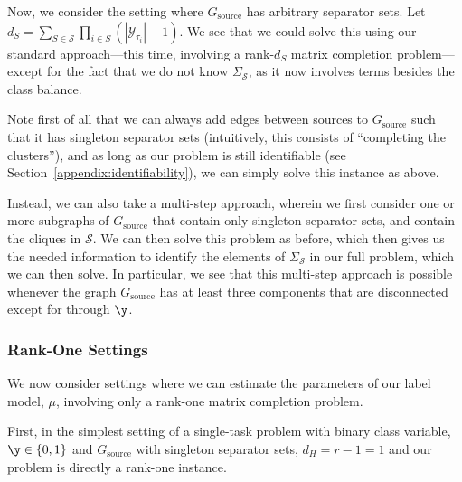 \documentclass[letterpaper]{article}
\begin{document}
\begin{appendix}
Now, we consider the setting where $G_{\text{source}}$ has arbitrary separator sets.
Let $d_S = \sum_{S \in \mathcal{S}} \prod_{i \in S} (|\mathcal{Y}_{\tau_i}|-1)$.
We see that we could solve this using our standard approach---this time, involving a rank-$d_S$ matrix completion problem---except for the fact that we do not know $\Sigma_\mathcal{S}$, as it now involves terms besides the class balance.

Note first of all that we can always add edges between sources to $G_{\text{source}}$ such that it has singleton separator sets (intuitively, this consists of ``completing the clusters''), and as long as our problem is still identifiable (see Section~\ref{appendix:identifiability}), we can simply solve this instance as above.

Instead, we can also take a multi-step approach, wherein we first consider one or more subgraphs of $G_{\text{source}}$ that contain only singleton separator sets, and contain the cliques in $\mathcal{S}$.
We can then solve this problem as before, which then gives us the needed information to identify the elements of $\Sigma_\mathcal{S}$ in our full problem, which we can then solve.
In particular, we see that this multi-step approach is possible whenever the graph $G_{\text{source}}$ has at least three components that are disconnected except for through $\y$.

\subsubsection{Rank-One Settings}
\label{appendix:rank-one-reduction}

We now consider settings where we can estimate the parameters of our label model, $\mu$, involving only a rank-one matrix completion problem.

First, in the simplest setting of a single-task problem with binary class variable, $\y \in \{0,1\}$ and $G_{\text{source}}$ with singleton separator sets, $d_H = r-1 = 1$ and our problem is directly a rank-one instance.


\end{appendix}
\end{document}
